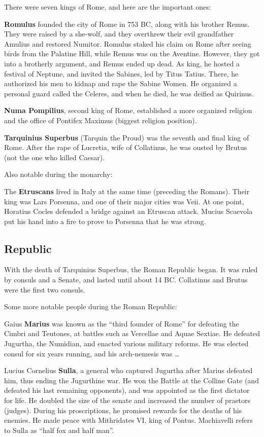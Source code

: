There were seven kings of Rome, and here are the important ones:

\textbf{Romulus} founded the city of Rome in 753 BC, along with his brother Remus.
They were raised by a she-wolf, and they overthrew their evil grandfather Amulius and restored Numitor.
Romulus staked his claim on Rome after seeing birds from the Palatine Hill, while Remus was on the Aventine.
However, they got into a brotherly argument, and Remus ended up dead.
As king, he hosted a festival of Neptune, and invited the Sabines, led by Titus Tatius.
There, he authorized his men to kidnap and rape the Sabine Women.
He organized a personal guard called the Celeres,
and when he died, he was deified as Quirinus.

\textbf{Numa Pompilius}, second king of Rome,
established a more organized religion and the office of Pontifex Maximus (biggest religion position).

\textbf{Tarquinius Superbus} (Tarquin the Proud) was the seventh and final king of Rome.
After the rape of Lucretia, wife of Collatinus, he was ousted by Brutus (not the one who killed Caesar).

Also notable during the monarchy:

The \textbf{Etruscans} lived in Italy at the same time (preceding the Romans).
Their king was Lars Porsenna, and one of their major cities was Veii.
At one point, Horatius Cocles defended a bridge against an Etruscan attack.
Mucius Scaevola put his hand into a fire to prove to Porsenna that he was strong.

\subsection*{Republic}

With the death of Tarquinius Superbus, the Roman Republic began.
It was ruled by consuls and a Senate, and lasted until about 14 BC\@.
Collatinus and Brutus were the first two consuls.

Some more notable people during the Roman Republic:

Gaius \textbf{Marius} was known as the ``third founder of Rome'' for defeating the Cimbri and Teutones,
at battles such as Vercellae and Aquae Sextiae.
He defeated Jugurtha, the Numidian, and enacted various military reforms.
He was elected consul for six years running, and his arch-nemesis was \ldots

Lucius Cornelius \textbf{Sulla}, a general who captured Jugurtha after Marius defeated him,
thus ending the Jugurthine war.
He won the Battle at the Colline Gate (and defeated his last remaining opponents),
and was appointed as the first dictator for life.
He doubled the size of the senate and increased the number of praetors (judges).
During his proscriptions, he promised rewards for the deaths of his enemies.
He made peace with Mithridates VI, king of Pontus.
Machiavelli refers to Sulla as ``half fox and half man''.


